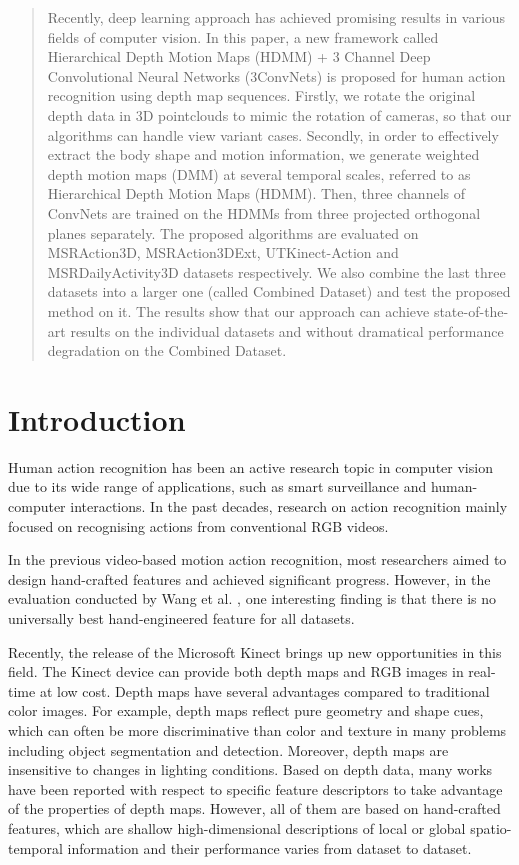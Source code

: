 \documentclass[conference]{IEEEtran}
\begin{document}
\begin{abstract}
Recently, deep learning approach has achieved promising results in various fields of computer vision. In this paper, a new framework called Hierarchical Depth Motion Maps (HDMM) + 3 Channel Deep Convolutional Neural Networks (3ConvNets) is proposed for human action recognition using depth map sequences. Firstly, we rotate the original depth data in 3D pointclouds to mimic the rotation of cameras, so that our algorithms can handle view variant cases. Secondly, in order to effectively extract the body shape and motion information, we generate weighted depth motion maps (DMM) at several temporal scales, referred to as Hierarchical Depth Motion Maps (HDMM). Then, three channels of ConvNets are trained on the HDMMs from three projected orthogonal planes separately. The proposed algorithms are evaluated on MSRAction3D, MSRAction3DExt, UTKinect-Action and MSRDailyActivity3D datasets respectively. We also combine the last three datasets into a larger one (called Combined Dataset) and test the proposed method on it. The results show that our approach can achieve state-of-the-art results on the individual datasets and without dramatical performance degradation on the Combined Dataset.
\end{abstract}

\section{Introduction}

Human action recognition has been an active research topic in computer vision due to its wide range of applications, such as smart surveillance and human-computer interactions. In the past decades, research on action recognition mainly focused on recognising actions from conventional RGB videos.

In the previous video-based motion action recognition, most researchers aimed to design hand-crafted features and achieved significant progress. However, in the evaluation conducted by Wang et al. \cite{wang2009evaluation}, one interesting finding is that there is no universally best hand-engineered feature for all datasets.


Recently, the release of the Microsoft Kinect brings up new opportunities in this field. The Kinect device can provide both depth maps and RGB images in real-time at low cost. Depth maps have several advantages compared to traditional color images. For example, depth maps reflect pure geometry and shape cues, which can often be more discriminative than color and texture in many problems including object segmentation and detection. Moreover, depth maps are insensitive to changes in lighting conditions. Based on depth data, many works \cite{Li2010, wang2012mining, Oreifej2013, yangsuper} have been reported with respect to specific feature descriptors to take advantage of the properties of depth maps. However, all of them are based on hand-crafted features, which are shallow high-dimensional descriptions of local or global spatio-temporal information and their performance varies from dataset to dataset.
\end{document}
